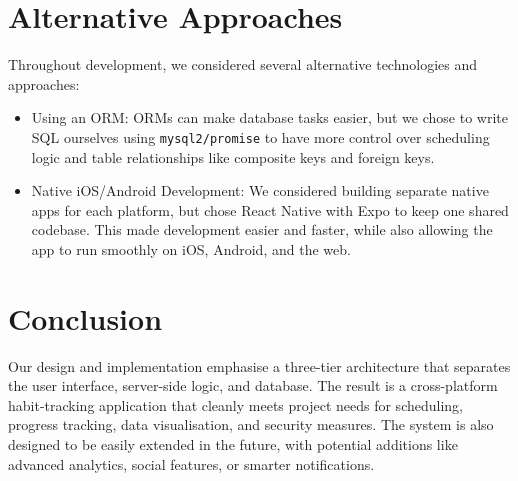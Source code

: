 \section{Alternative Approaches}

Throughout development, we considered several alternative technologies and approaches:

\begin{itemize}
  \item {Using an ORM}: ORMs can make database tasks easier, but we chose to write SQL ourselves using \texttt{mysql2/promise} to have more control over scheduling logic and table relationships like composite keys and foreign keys.

  \item {Native iOS/Android Development}: We considered building separate native apps for each platform, but chose React Native with Expo to keep one shared codebase. This made development easier and faster, while also allowing the app to run smoothly on iOS, Android, and the web.
\end{itemize}


\section{Conclusion}

Our design and implementation emphasise a three-tier architecture that separates the user interface, server-side logic, and database.
The result is a cross-platform habit-tracking application that cleanly meets project needs for scheduling, progress tracking, data visualisation, and security measures. The system is also designed to be easily extended in the future, with potential additions like advanced analytics, social features, or smarter notifications.
